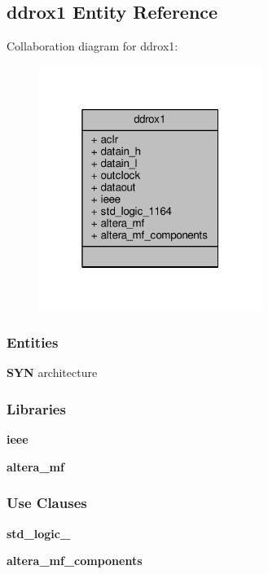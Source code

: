\subsection{ddrox1 Entity Reference}
\label{classddrox1}


Collaboration diagram for ddrox1\+:\nopagebreak
\begin{figure}[H]
\begin{center}
\leavevmode
\includegraphics[width=205pt]{d7/dc0/classddrox1__coll__graph}
\end{center}
\end{figure}
\subsubsection*{Entities}
\begin{DoxyCompactItemize}
\item 
{\bf S\+YN} architecture
\end{DoxyCompactItemize}
\subsubsection*{Libraries}
 \begin{DoxyCompactItemize}
\item 
{\bf ieee} 
\item 
{\bf altera\+\_\+mf} 
\end{DoxyCompactItemize}
\subsubsection*{Use Clauses}
 \begin{DoxyCompactItemize}
\item 
{\bf std\+\_\+logic\+\_}   
\item 
{\bf altera\+\_\+mf\+\_\+components}   
\end{DoxyCompactItemize}
